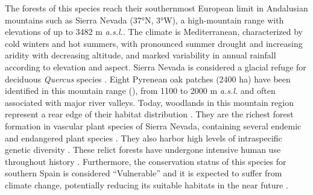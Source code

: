 The forests of this species reach their southernmost European limit in Andalusian mountains such as Sierra Nevada (37°N, 3°W), a high-mountain range with elevations of up to 3482 m \emph{a.s.l.}. The climate is Mediterranean, characterized by cold winters and hot summers, with pronounced summer drought and increasing aridity with decreasing altitude, and marked variability in annual rainfall according to elevation and aspect. Sierra Nevada is considered a glacial refuge for deciduous \emph{Quercus} species \autocite{Olaldeetal2002WhiteOaks}. Eight Pyrenean oak patches (2400 ha) have been identified in this mountain range (), from 1100 to 2000 m \emph{a.s.l.} and often associated with major river valleys. Today, \Qpy woodlands in this mountain region represent a rear edge of their habitat distribution \autocite{HampePetit2005ConservingBiodiversity}. They are the richest forest formation in vascular plant species of Sierra Nevada, containing several endemic and endangered plant species \autocite{Loriteetal2008PhytosociologicalReview}. They also harbor high levels of intraspecific genetic diversity \autocite{ValbuenaCarabanaGil2013GeneticResilience}. These relict forests have undergone intensive human use throughout history \autocite{CamachoOlmedoetal2002DinamicaEvolutiva}. Furthermore, the conservation status of this species for southern Spain is considered ``Vulnerable'' and it is expected to suffer from climate change, potentially reducing its suitable habitats in the near future \autocite{GeaIzquierdoetal2013GrowthProjections,GeaIzquierdoetal2017RiskyFuture}.

